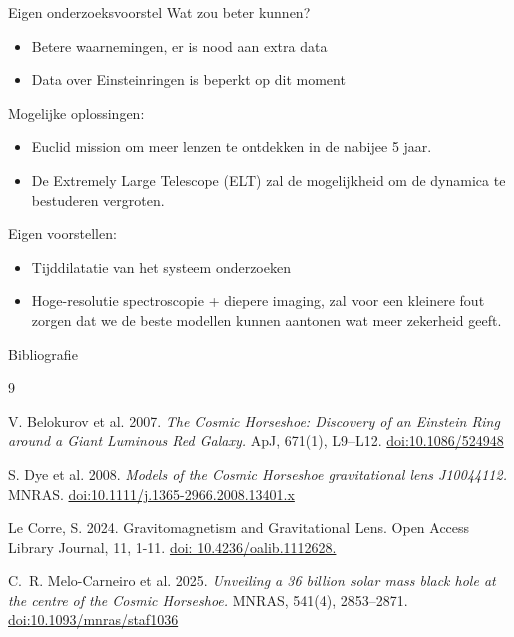 \documentclass[aspectratio=169,xcolor=dvipsnames]{beamer}
\begin{document}
\begin{frame}{Eigen onderzoeksvoorstel}
    Wat zou beter kunnen?
    \begin{itemize}
        \item Betere waarnemingen, er is nood aan extra data
        \item Data over Einsteinringen is beperkt op dit moment
        
    \end{itemize}

    Mogelijke oplossingen:
    \begin{itemize}
        \item Euclid mission om meer lenzen te ontdekken in de nabijee 5 jaar.
        \item De Extremely Large Telescope (ELT) zal de mogelijkheid om de dynamica te bestuderen vergroten. 
        
    \end{itemize}
    Eigen voorstellen:
    \begin{itemize}
        \item Tijddilatatie van het systeem onderzoeken 
        \item Hoge-resolutie spectroscopie + diepere imaging, zal voor een kleinere fout zorgen dat we de beste modellen kunnen aantonen wat meer zekerheid geeft.
    \end{itemize}

    
\end{frame}


\begin{frame}{Bibliografie}
  \begin{thebibliography}{9}

    V. Belokurov et al. 2007.
    \textit{The Cosmic Horseshoe: Discovery of an Einstein Ring around a Giant Luminous Red Galaxy.}
    ApJ, 671(1), L9–L12.
    \href{https://doi.org/10.1086/524948}{doi:10.1086/524948}

    S. Dye et al. 2008.
    \textit{Models of the Cosmic Horseshoe gravitational lens J10044112.}
    MNRAS.
    \href{https://doi.org/10.1111/j.1365-2966.2008.13401.x}{doi:10.1111/j.1365-2966.2008.13401.x}

    

    Le Corre, S. 2024. Gravitomagnetism and Gravitational Lens. Open Access Library Journal, 11, 1-11. \href{https://www.scirp.org/journal/paperinformation?paperid=138088}{doi: 10.4236/oalib.1112628.}

    C.~R. Melo-Carneiro et al. 2025.
    \textit{Unveiling a 36 billion solar mass black hole at the centre of the Cosmic Horseshoe.}
    MNRAS, 541(4), 2853–2871.
    \href{https://doi.org/10.1093/mnras/staf1036}{doi:10.1093/mnras/staf1036}

    

    
  \end{thebibliography}
\end{frame}
\end{document}

